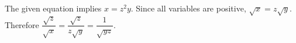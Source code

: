 The given equation implies $x=z^2y$. Since all variables are positive, $\sqrt x=z\sqrt y$. Therefore $\dfrac{\sqrt z}{\sqrt x}=\dfrac{\sqrt z}{z\sqrt y}=\boxed{\dfrac{1}{\sqrt{yz}}}$.
